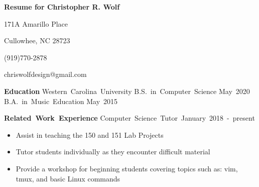 \documentclass[12pt]{letter}
\begin{document}
    \thispagestyle{empty} %

    \centerline{\textbf{\large Resume for Christopher R. Wolf}}
    \centerline{171A Amarillo Place}
    \centerline{Cullowhee, NC 28723}
    \centerline{(919)770-2878}
    \centerline{chriswolfdesign@gmail.com}

    \vspace{10 mm}
    \textbf{\large Education}
    \vspace{5 mm}
    \hbox{Western Carolina University}
    \linebreak
    \hbox{B.S. in Computer Science} \hspace{200pt} \hbox{May 2020}
    \linebreak
    \hbox{B.A. in Music Education} \hspace{245pt} \hbox{May 2015}

    \vspace {10 mm}
    \hbox{\textbf{\large {Related Work Experience}}}
    \vspace{5 mm}
    \hbox{Computer Science Tutor \hspace{185pt} January 2018 - present}
    \vspace{-5 mm}
    \begin{itemize}
        \itemsep 0em
        \item Assist in teaching the 150 and 151 Lab Projects
        \item Tutor students individually as they encounter difficult material
        \item Provide a workshop for beginning students covering topics such 
            as: vim, tmux, and basic Linux commands
    \end{itemize}
\end{document}
